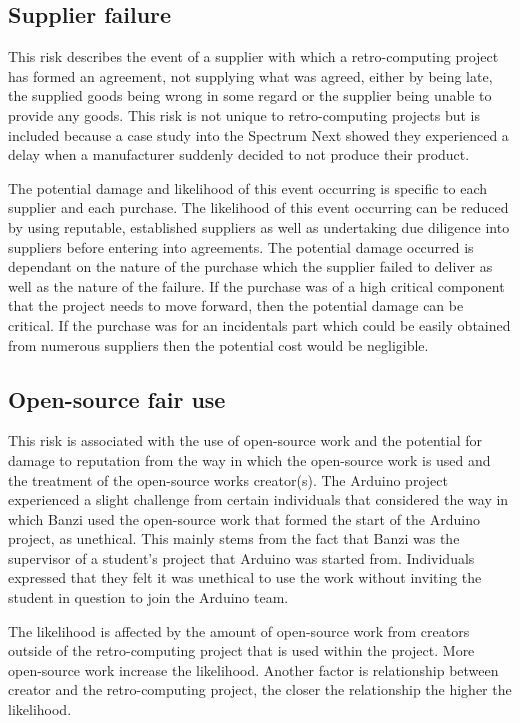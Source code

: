 \subsection{Supplier failure}
This risk describes the event of a supplier with which a retro-computing project has formed an agreement, not supplying what was agreed, either by being late, the supplied goods being wrong in some regard or the supplier being unable to provide any goods. This risk is not unique to retro-computing projects but is included because a case study into the Spectrum Next showed they experienced a delay when a manufacturer suddenly decided to not produce their product.

The potential damage and likelihood of this event occurring is specific to each supplier and each purchase. The likelihood of this event occurring can be reduced by using reputable, established suppliers as well as undertaking due diligence into suppliers before entering into agreements. The potential damage occurred is dependant on the nature of the purchase which the supplier failed to deliver as well as the nature of the failure. If the purchase was of a high critical component that the project needs to move forward, then the potential damage can be critical. If the purchase was for an incidentals part which could be easily obtained from numerous suppliers then the potential cost would be negligible.\\


\subsection{Open-source fair use}
This risk is associated with the use of open-source work and the potential for damage to reputation from the way in which the open-source work is used and the treatment of the open-source works creator(s). The Arduino project experienced a slight challenge from certain individuals that considered the way in which Banzi used the open-source work that formed the start of the Arduino project, as unethical. This mainly stems from the fact that Banzi was the supervisor of a student's project that Arduino was started from. Individuals expressed that they felt it was unethical to use the work without inviting the student in question to join the Arduino team.  

The likelihood is affected by the amount of open-source work from creators outside of the retro-computing project that is used within the project. More open-source work increase the likelihood. Another factor is relationship between creator and the retro-computing project, the closer the relationship the higher the likelihood.

